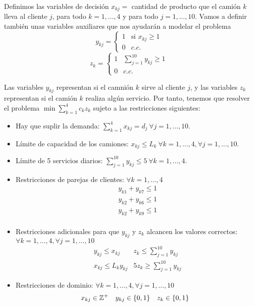 \documentclass[twoside]{article}
\begin{document}
\begin{solucion}
Definimos las variables de decisión $x_{kj}=$ cantidad de producto que el camión $k$ lleva al cliente $j$, para todo $k=1,\dots, 4$ y para todo $j=1,\dots, 10$. Vamos a definir también unas variables auxiliares que nos ayudarán a modelar el problema
\[
y_{kj}=\begin{cases}
1 & \text{si }x_{kj}\geq 1\\
0 & c.c.
\end{cases}
\]
\[
z_k=\begin{cases}
1 & \sum_{j=1}^{10}y_{kj}\geq 1\\
0 & c.c.
\end{cases}
\]

Las variables $y_{kj}$ representan si el camnión $k$ sirve al cliente $j$, y las variables $z_k$ representan si el camión $k$ realiza algún servicio. Por tanto, tenemos que resolver el problema $\min \sum_{k=1}^4c_kz_{k}$ sujeto a las restricciones siguientes:
\begin{itemize}
\item Hay que suplir la demanda: $\sum_{k=1}^4 x_{kj}=d_j\ \forall j=1,\dots, 10$.
\item Límite de capacidad de los camiones: $x_{kj}\leq L_k\ \forall k=1,\dots, 4, \forall j=1,\dots, 10$. 
\item Límite de 5 servicios diarios: $\sum_{j=1}^{10} y_{kj}\leq 5\ \forall k=1,\dots, 4$.
\item Restricciones de parejas de clientes: $\forall k=1,\dots, 4$
\begin{align*}
&y_{k1}+y_{k7}\leq 1\\
&y_{k2}+y_{k6}\leq 1\\
&y_{k2}+y_{k9}\leq 1\\
\end{align*}
\item Restricciones adicionales para que $y_{kj}$ y $z_k$ alcancen los valores correctos: $\forall k=1,\dots, 4, \forall j=1,\dots, 10$
\begin{align*}
&y_{kj}\leq x_{kj} & z_k\leq \sum_{j=1}^{10}y_{kj}\\
&x_{kj}\leq L_k y_{kj} & 5z_k\geq \sum_{j=1}^{10}y_{kj}
\end{align*}
\item Restricciones de dominio: $\forall k=1,\dots, 4, \forall j=1,\dots, 10$
\begin{align*}
&x_{kj}\in\mathbb{Z}^+ &y_{kj}\in\{0,1\}& &z_k\in\{0,1\}
\end{align*}
\end{itemize}


\end{solucion}
\end{document}
